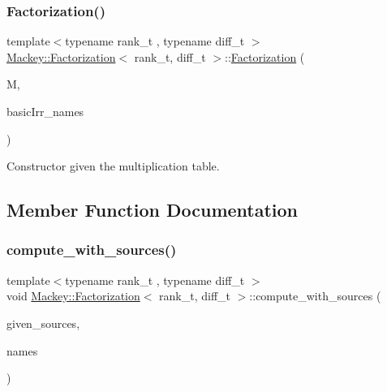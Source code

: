 \subsubsection{\texorpdfstring{Factorization()}{Factorization()}\hspace{0.1cm}{\footnotesize\ttfamily [2/2]}}
{\footnotesize\ttfamily template$<$typename rank\+\_\+t , typename diff\+\_\+t $>$ \\
\hyperlink{classMackey_1_1Factorization}{Mackey\+::\+Factorization}$<$ rank\+\_\+t, diff\+\_\+t $>$\+::\hyperlink{classMackey_1_1Factorization}{Factorization} (\begin{DoxyParamCaption}\item[{\hyperlink{classMackey_1_1MultiplicationTable}{Multiplication\+Table}$<$ rank\+\_\+t, diff\+\_\+t $>$ \&}]{M,  }\item[{const std\+::vector$<$ std\+::string $>$ \&}]{basic\+Irr\+\_\+names }\end{DoxyParamCaption})\hspace{0.3cm}{\ttfamily [inline]}}



Constructor given the multiplication table. 



\subsection{Member Function Documentation}
\mbox{\label{classMackey_1_1Factorization_a2e135a37687fc3d69cd16a8729dd19eb}} 
\subsubsection{\texorpdfstring{compute\+\_\+with\+\_\+sources()}{compute\_with\_sources()}}
{\footnotesize\ttfamily template$<$typename rank\+\_\+t , typename diff\+\_\+t $>$ \\
void \hyperlink{classMackey_1_1Factorization}{Mackey\+::\+Factorization}$<$ rank\+\_\+t, diff\+\_\+t $>$\+::compute\+\_\+with\+\_\+sources (\begin{DoxyParamCaption}\item[{const std\+::vector$<$ std\+::vector$<$ int $>$$>$ \&}]{given\+\_\+sources,  }\item[{const std\+::vector$<$ std\+::string $>$ \&}]{names }\end{DoxyParamCaption})}



